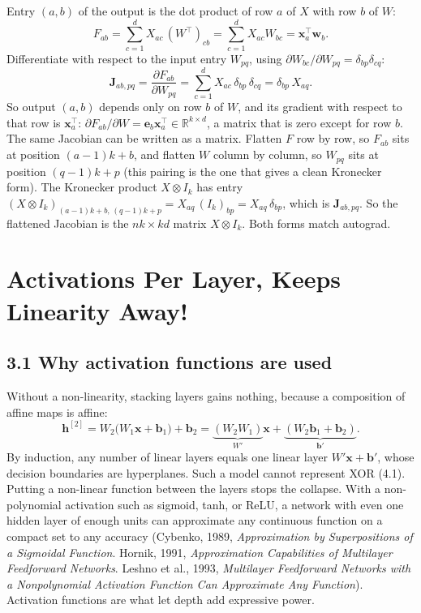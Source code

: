 \documentclass[11pt]{article}
\newcommand{\R}{\mathbb{R}}
\begin{document}
Entry $(a,b)$ of the output is the dot product of row $a$ of $X$ with row $b$ of $W$:
\[
F_{ab} = \sum_{c=1}^{d} X_{ac}\,(W^\top)_{cb} = \sum_{c=1}^{d} X_{ac}W_{bc} = \mathbf{x}_a^\top\mathbf{w}_b .
\]
Differentiate with respect to the input entry $W_{pq}$, using $\partial W_{bc}/\partial W_{pq} = \delta_{bp}\delta_{cq}$:
\[
\mathbf{J}_{ab,pq} = \frac{\partial F_{ab}}{\partial W_{pq}} = \sum_{c=1}^d X_{ac}\,\delta_{bp}\,\delta_{cq} = \delta_{bp}\,X_{aq}.
\]
So output $(a,b)$ depends only on row $b$ of $W$, and its gradient with respect to that row is $\mathbf{x}_a^\top$: $\partial F_{ab}/\partial W = \mathbf{e}_b\mathbf{x}_a^\top\in\R^{k\times d}$, a matrix that is zero except for row $b$. The same Jacobian can be written as a matrix. Flatten $F$ row by row, so $F_{ab}$ sits at position $(a-1)k+b$, and flatten $W$ column by column, so $W_{pq}$ sits at position $(q-1)k+p$ (this pairing is the one that gives a clean Kronecker form). The Kronecker product $X\otimes I_k$ has entry $(X\otimes I_k)_{(a-1)k+b,\,(q-1)k+p} = X_{aq}\,(I_k)_{bp} = X_{aq}\,\delta_{bp}$, which is $\mathbf{J}_{ab,pq}$. So the flattened Jacobian is the $nk\times kd$ matrix $X\otimes I_k$. Both forms match autograd.

\section{Activations Per Layer, Keeps Linearity Away!}

\subsection*{3.1 Why activation functions are used}
Without a non-linearity, stacking layers gains nothing, because a composition of affine maps is affine:
\[
\mathbf{h}^{[2]} = W_2\big(W_1\mathbf{x}+\mathbf{b}_1\big)+\mathbf{b}_2 = \underbrace{(W_2W_1)}_{W'}\mathbf{x} + \underbrace{(W_2\mathbf{b}_1+\mathbf{b}_2)}_{\mathbf{b}'} .
\]
By induction, any number of linear layers equals one linear layer $W'\mathbf{x}+\mathbf{b}'$, whose decision boundaries are hyperplanes. Such a model cannot represent XOR (4.1). Putting a non-linear function between the layers stops the collapse. With a non-polynomial activation such as sigmoid, tanh, or ReLU, a network with even one hidden layer of enough units can approximate any continuous function on a compact set to any accuracy (Cybenko, 1989, \emph{Approximation by Superpositions of a Sigmoidal Function}. Hornik, 1991, \emph{Approximation Capabilities of Multilayer Feedforward Networks}. Leshno et al., 1993, \emph{Multilayer Feedforward Networks with a Nonpolynomial Activation Function Can Approximate Any Function}). Activation functions are what let depth add expressive power.
\end{document}
